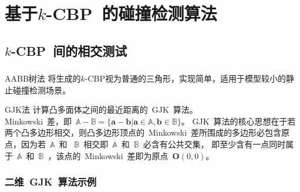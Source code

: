   \section{基于$k$-CBP~的碰撞检测算法}
    
      \subsection{$k$-CBP~间的相交测试}
      \begin{frame}
        \frametitle{}
        \begin{block}{AABB树法}
          将生成的$k$-CBP视为普通的三角形，实现简单，适用于模型较小的静止碰撞检测场景。
        \end{block}
        \begin{block}{GJK法}
          计算凸多面体之间的最近距离的~GJK~算法。\\
          Minkowski~差，即~$\mathbb{A} - \mathbb{B} = \{ \bm{a} - \bm{b} | \bm{a} \in \mathbb{A}, \bm{b} \in \mathbb{B}\} $。
GJK~算法的核心思想在于若两个凸多边形相交，则凸多边形顶点的~Minkowski~差所围成的多边形必包含原点，因为若~$\mathbb{A}$~和
~$\mathbb{B}$~相交即~$\mathbb{A}$~和~$\mathbb{B}$~必含有公共交集，
即至少含有一点同时属于~$\mathbb{A}$~和~$\mathbb{B}$~，该点的~Minkowski~差即为原点~$\bm{O}(0, 0)$。
        \end{block}

      \end{frame}

      \begin{frame}
        \frametitle{二维~GJK~算法示例}
        \begin{figure}[htbp]
        \end{figure}
        
      \end{frame}

